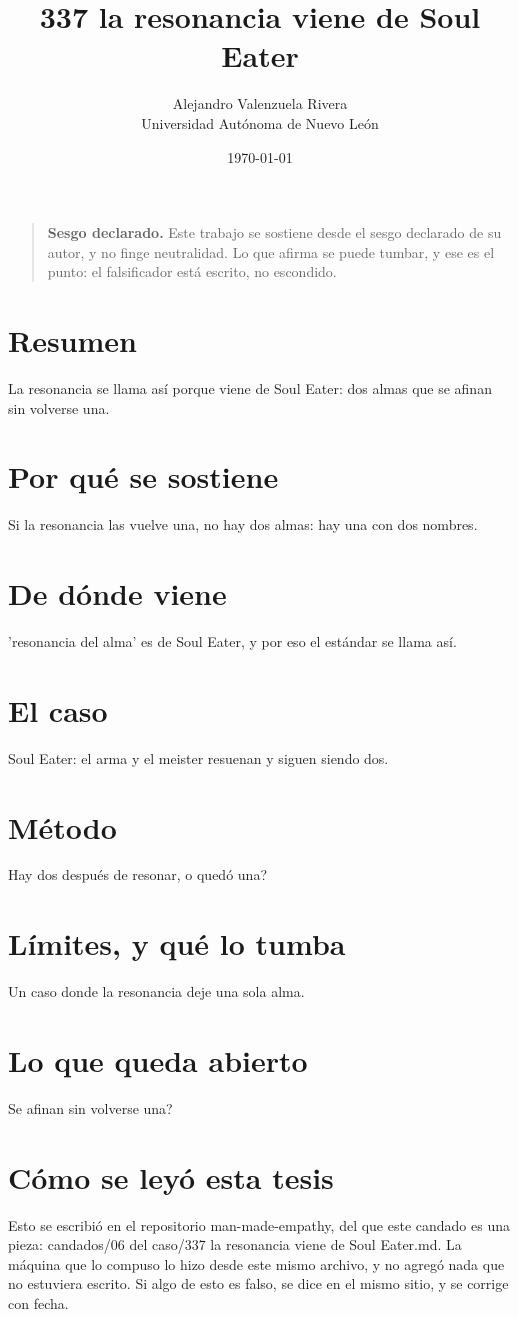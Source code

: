 \documentclass[11pt,a4paper]{article}
\title{337 la resonancia viene de Soul Eater}
\author{Alejandro Valenzuela Rivera\\\small Universidad Autónoma de Nuevo León}
\date{\today}
\begin{document}
\maketitle

\begin{quote}
\textbf{Sesgo declarado.} Este trabajo se sostiene desde el sesgo declarado de su autor, y no finge neutralidad. Lo que afirma se puede tumbar, y ese es el punto: el falsificador está escrito, no escondido.
\end{quote}

\section*{Resumen}
La resonancia se llama así porque viene de Soul Eater: dos almas que se afinan sin volverse una.

\section{Por qué se sostiene}
Si la resonancia las vuelve una, no hay dos almas: hay una con dos nombres.

\section{De dónde viene}
'resonancia del alma' es de Soul Eater, y por eso el estándar se llama así.

\section{El caso}
Soul Eater: el arma y el meister resuenan y siguen siendo dos.

\section{Método}
\textquestiondown{}Hay dos después de resonar, o quedó una?

\section{Límites, y qué lo tumba}
Un caso donde la resonancia deje una sola alma.

\section{Lo que queda abierto}
\textquestiondown{}Se afinan sin volverse una?

\section*{Cómo se leyó esta tesis}
Esto se escribió en el repositorio man-made-empathy, del que este candado es una pieza: candados/06 del caso/337 la resonancia viene de Soul Eater.md. La máquina que lo compuso lo hizo desde este mismo archivo, y no agregó nada que no estuviera escrito. Si algo de esto es falso, se dice en el mismo sitio, y se corrige con fecha.
\end{document}
